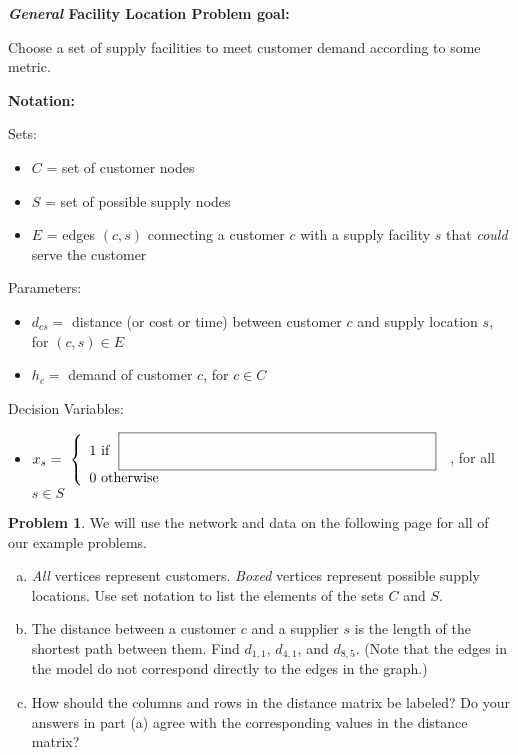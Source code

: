 \documentclass[11pt]{article}
\theoremstyle{definition}
\newtheorem{problem}{Problem}
\newcommand{\answerbox}[3]{%
  \fbox{%
    \begin{minipage}[#1]{#2}
      \hfill\vspace{#3}
    \end{minipage}
  }
}
\newcommand{\answerboxone}[2]{%
  \answerbox{#1}{6.0in}{#2} 
}
\begin{document}
\bigskip
\textbf{\emph{General} Facility Location Problem goal:}

\begin{tcolorbox}
Choose a set of supply facilities to meet customer demand according to some metric.  
\end{tcolorbox}

\bigskip
\textbf{Notation:}

Sets: 
\begin{itemize}
\item[]
 $C$ = set of customer nodes 
\item[]
$S$ = set of possible supply nodes 
\item[]
$E$ = edges $(c,s)$ connecting a customer $c$ with a supply facility $s$ that \emph{could} serve the customer
\end{itemize}

Parameters: 
\begin{itemize}
\item[]
 $d_{cs} =$ distance (or cost or time) between customer $c$ and supply location $s$, for $(c,s) \in E$
 \item[]
 $h_c =$ demand of customer $c$, for $c \in C$
\end{itemize}


\smallskip
Decision Variables: 
\begin{itemize}
\item[] 
\def\arraystretch{1.8} 
$x_s = ~\left\{ 
\begin{array}{ll} 
1 \text{ if } ~\answerbox{c}{3in}{.7cm} \\ 
0 \text{ otherwise } 
\end{array} \right. $
, for all $s \in S$
\end{itemize}

\vspace{0.5cm}
\begin{problem} We will use the network and data on the following page for all of our example problems.
\begin{enumerate}[(a)] 
\item \emph{All} vertices represent customers.  \emph{Boxed} vertices represent possible supply locations. Use set notation to list the elements of the sets $C$ and $S$.  

\answerboxone{c}{1.7cm}

\item The distance between a customer $c$ and a supplier $s$ is the length of the shortest path between them.
Find $d_{1,1}$, $d_{4,1}$, and $d_{8,5}$.  (Note that the edges in the model do not correspond directly to the edges in the graph.)

\answerboxone{c}{1cm}

\item How should the columns and rows in the distance matrix be labeled?  Do your answers in part (a) agree with the corresponding values in the distance matrix?  

\answerboxone{c}{1.5cm}
\end{enumerate}
\end{problem}
\end{document}
